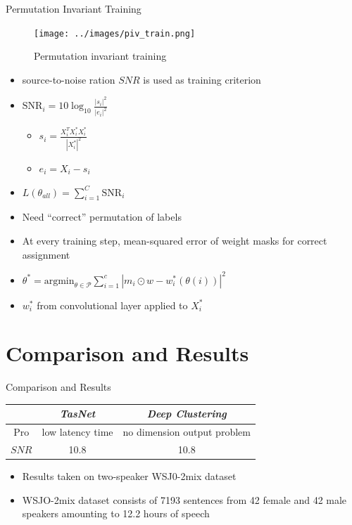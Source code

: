 \documentclass[xcolor=table,mathserif,9pt]{beamer}    %
\begin{document}
\begin{frame}{Permutation Invariant Training \cite{7979557}}
\begin{minipage}[t]{0.48\linewidth}
\hfill
\begin{figure}[htpb]
	\centering
	\texttt{[image: ../images/piv\_train.png]}
	\caption{Permutation invariant training}
\end{figure}
\end{minipage}
\hfill
\begin{minipage}[t]{0.48\linewidth}
\begin{itemize}
	\item source-to-noise ration $SNR$ \cite{AudioSpeechLanguageProcessing} is used as training criterion
	\item $\text{SNR}_i  = 10\log_{10}\frac{|s_{i}|^2}{|e_{i}|^2}$
	\begin{itemize}
		\item $s_{i} = \frac{X_i^TX_i^{*}X_i^{*}}{|X_i^{*}|^2}$
		\item $e_i = X_i - s_i$
	\end{itemize}
	\item \emph{$L(\theta_{all}) = \sum_{i=1}^C \text{SNR}_i$}
	\item Need ``correct'' permutation of labels  
	\item At every training step, mean-squared error of weight masks for correct assignment
	\item $ \theta^{*} = \text{argmin}_{\theta \in \mathcal{P}} \sum_{i=1}^{c} |m_i \odot w - w_i^{*}(\theta(i))|^2$ 
	\item $w_i^{*}$ from convolutional layer applied to $X_i^{*}$
\end{itemize}
\end{minipage}

\end{frame}

\section{Comparison and Results}%
\label{sec:results}
\begin{frame}{Comparison and Results}

\begin{table}
\centering
\begin{tabular}{|c|c|c|}
	\hline
	 & \emph{TasNet} & \emph{Deep Clustering}  \\
	\hline
	 Pro      & low latency time & no dimension output problem \\
	 $SNR$   & 10.8   & 10.8  \\
	\hline
\end{tabular}
\end{table}

\vspace{10mm}
\begin{itemize}
	\item Results taken on two-speaker WSJ0-2mix dataset \cite{TasNet2017}
	\item WSJO-2mix dataset consists of 7193 sentences from 42 female and 42 male         speakers amounting to 12.2 hours of speech
\end{itemize}
\end{frame}
\end{document}

